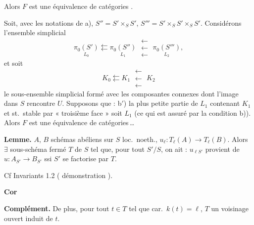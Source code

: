 \documentclass[11pt,a4paper]{article}
\begin{document}
Alors $F$ est une équivalence de catégories .


Soit, avec les notations de a), $S'' = S' \times_S S'$,
$S''' = S' \times_S S' \times_S S'$. Considérons l'ensemble simplicial
\[
  \underset{L_0}{\pi_0(S')} \leftleftarrows \underset{L_1}{\pi_0(S'')}
  \;\substack{\leftarrow\\[-2pt]\leftarrow\\[-2pt]\leftarrow}\;
  \underset{L_2}{\pi_0(S''')},
\]
 et soit
\[
  K_0 \leftleftarrows K_1 \;\substack{\leftarrow\\[-2pt]\leftarrow\\[-2pt]\leftarrow}\; K_2
\]
le sous-ensemble simplicial formé avec les composantes connexes dont l'image
dans $S$ rencontre $U$. Supposons que : 
b$'$) la plus petite partie de $L_1$ contenant $K_1$ et st.\ stable par
« troisième face » soit $L_1$ (ce qui est assuré par la condition b)).
Alors $F$ est  une équivalence de catégories\,\ldots
{}


\textbf{Lemme.} $A$, $B$ schémas abéliens sur $S$ loc.\ noeth.,
$u_\ell : T_\ell(A) \to T_\ell(B)$. Alors $\exists$ sous-schéma fermé $T$ de
$S$ tel que, pour tout $S'/S$, on ait : $u_{\ell S'}$ provient de
$u : A_{S'} \to B_{S'}$ ssi $S'$ se factorise par $T$.

Cf Invariants 1.2 ( démonstration ).

\textbf{Cor} 

\textbf{Complément.} De plus, \struck{\ill{}} pour tout $t \in T$ tel que
car.\ $k(t) = \ell$, $T$  un voisinage ouvert
induit de $t$.
\end{document}
